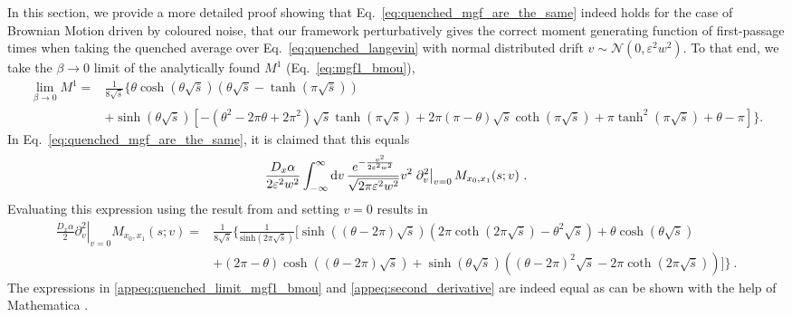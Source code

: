 \documentclass[%
 reprint,
superscriptaddress,
nofootinbib,
 amsmath,amssymb,
 aps,
prx,
]{revtex4-2}
\begin{document}
\begin{widetext}
In  this section, we provide  a more detailed proof showing that Eq.~\eqref{eq:quenched_mgf_are_the_same} indeed holds for the case of Brownian Motion driven by coloured noise, \ie that our framework perturbatively gives the correct moment generating function of first-passage times when taking the quenched average over Eq.~\eqref{eq:quenched_langevin} with normal distributed drift $v \sim \mathcal{N}(0, \varepsilon^2 w^2)$. 
To that end, we take the $\beta \to 0$ limit of the analytically found $M^1$  (\cf Eq.~\eqref{eq:mgf1_bmou}),
\begin{align}
\label{appeq:quenched_limit_mgf1_bmou}
\lim_{\beta \to 0} M^1 = &\frac{1}{8  \sqrt{\bar{s} }} \Big\lbrace \theta  \cosh \left(\theta  \sqrt{\bar{s} }\right) \left(\theta  \sqrt{\bar{s} }-\tanh \left(\pi  \sqrt{\bar{s} }\right)\right) \\
&+\sinh \left(\theta  \sqrt{\bar{s} }\right) \left[-\left(\theta ^2-2 \pi  \theta +2 \pi ^2\right) \sqrt{\bar{s} } \tanh \left(\pi  \sqrt{\bar{s} }\right)+2 \pi  (\pi -\theta ) \sqrt{\bar{s} } \coth \left(\pi  \sqrt{\bar{s} }\right)+\pi  \tanh ^2\left(\pi  \sqrt{\bar{s} }\right)+\theta -\pi \right]\Big\rbrace. \nonumber 
\end{align}
In Eq.~\eqref{eq:quenched_mgf_are_the_same}, it is claimed that this equals
\begin{align}
   \frac{D_x \alpha}{2\varepsilon^2 w^2} \int_{-\infty}^{\infty} \mathrm{d}{v}\, \frac{e^{-\frac{v^2}{2\varepsilon^2 w^2}}}{\sqrt{2\pi \varepsilon^2 w^2}} v^2 \left. \partial_v^2 \right|_{v=0} M_{x_0, x_1}( s; v) \ .
   \label{appeq:derivative_mgfv}
\end{align}
Evaluating this expression using the result from  and setting $v=0$  results in
\begin{align}
\label{appeq:second_derivative}
    \frac{D_x \alpha}{2}  \left. \partial_v^2 \right|_{v=0}M_{x_0, x_1}( s; v) =& \frac{1}{8 \sqrt{\bar{s} } } \Big\lbrace \frac{1}{\text{sinh}   \left(2 \pi  \sqrt{\bar{s} }\right)} \Big[\sinh \left((\theta -2 \pi ) \sqrt{\bar{s} }\right) \left(2 \pi  \coth \left(2 \pi  \sqrt{\bar{s} }\right)-\theta ^2 \sqrt{\bar{s} }\right) +\theta  \cosh \left(\theta  \sqrt{\bar{s} }\right) \nonumber \\
    &+(2 \pi -\theta ) \cosh \left((\theta -2 \pi ) \sqrt{\bar{s} }\right)+\sinh \left(\theta  \sqrt{\bar{s} }\right) \left((\theta -2 \pi )^2 \sqrt{\bar{s} }-2 \pi  \coth \left(2 \pi  \sqrt{\bar{s} }\right)\right)\Big] \Big\rbrace\ . \nonumber
\end{align}
The expressions in \eqref{appeq:quenched_limit_mgf1_bmou} and \eqref{appeq:second_derivative} are indeed equal as can be shown with the help of Mathematica \cite{Mathematica}.



\end{widetext}
\end{document}
